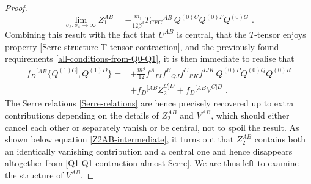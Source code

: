 \documentclass[12pt]{article}
\numberwithin{equation}{section}
\begin{document}
\begin{proof}
\begin{equation}
\lim_{\sigma_{3},\sigma_{4}\rightarrow\infty}Z_{1}^{AB}=-\tfrac{m_{1}}{12\beta^3}T_{CFG}{}^{AB} \, Q^{(0)C}Q^{(0)F}Q^{(0)G} \,\, .
\end{equation}
Combining this result with the fact that $U^{AB}$ is central, that the $T$-tensor enjoys property \eqref{Serre-structure-T-tensor-contraction}, and the previously found requirements \eqref{all-conditions-from-Q0-Q1}, it is then immediate to realise that
\begin{equation}\label{Q1-Q1-contraction-almost-Serre}
\begin{aligned}
f_{D}{}^{[AB}\{Q^{(1)C]},Q^{(1)D}\} =&+\tfrac{m_{1}^4}{12}f^{A}{}_{PI}f^{B}{}_{QJ}f^{C}{}_{RK}f^{IJK} \, Q^{(0)P}Q^{(0)Q}Q^{(0)R}
\\
&+f_{D}{}^{[AB}Z_{2}^{C]D}+f_{D}{}^{[AB}V^{C]D} \,\, .
\end{aligned}
\end{equation}
The Serre relations \eqref{Serre-relations} are hence precisely recovered up to extra contributions depending on the details of $Z_{2}^{AB}$ and $V^{AB}$, which should either cancel each other or separately vanish or be central, not to spoil the result. As shown below equation \eqref{Z2AB-intermediate}, it turns out that $Z_{2}^{AB}$ contains both an identically vanishing contribution and a central one and hence disappears altogether from \eqref{Q1-Q1-contraction-almost-Serre}. We are thus left to examine the structure of $V^{AB}$.


\end{proof}
\end{document}
